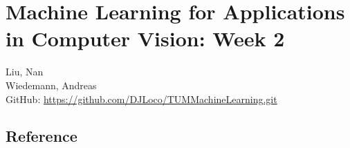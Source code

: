 \documentclass[12pt,a4paper,twoside]{article}
\begin{document}
\section*{Machine Learning for Applications \\
in Computer Vision: Week 2}
\hrulefill

Liu, Nan \\
Wiedemann, Andreas\\

GitHub: \url{https://github.com/DJLoco/TUMMachineLearning.git}\\


\hrulefill



\subsection*{Reference}
\end{document}
